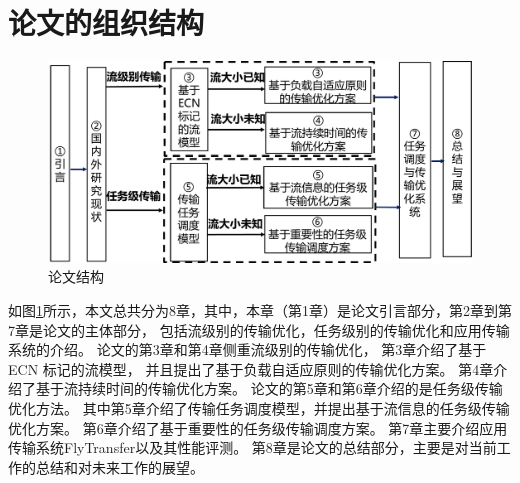 \section{论文的组织结构}
\label{cha:LPD}
\begin{figure}[b]
\begin{center}
\includegraphics [width=0.9\columnwidth] {figures/structure.pdf}
\caption{论文结构}
\label{paper-structure-fig}
\end{center}
\end{figure}
如图\ref{paper-structure-fig}所示，本文总共分为8章，其中，本章（第1章）是论文引言部分，第2章到第7章是论文的主体部分，
包括流级别的传输优化，任务级别的传输优化和应用传输系统的介绍。
论文的第3章和第4章侧重流级别的传输优化，
第3章介绍了基于 ECN 标记的流模型，
并且提出了基于负载自适应原则的传输优化方案。
第4章介绍了基于流持续时间的传输优化方案。
论文的第5章和第6章介绍的是任务级传输优化方法。
其中第5章介绍了传输任务调度模型，并提出基于流信息的任务级传输优化方案。
第6章介绍了基于重要性的任务级传输调度方案。
第7章主要介绍应用传输系统FlyTransfer以及其性能评测。
第8章是论文的总结部分，主要是对当前工作的总结和对未来工作的展望。



